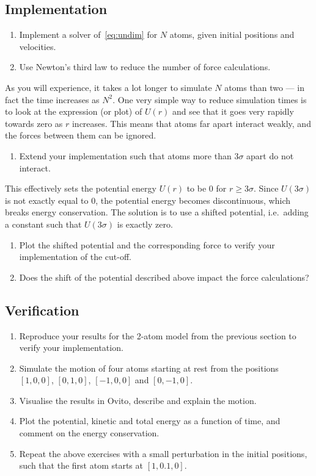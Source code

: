 \documentclass[11pt,british,a4paper]{report}
\begin{document}
\subsection{Implementation}
\begin{enumerate}[label=\roman*.]
    \item Implement a solver of~\vref{eq:undim} for \(N\) atoms, given initial positions and velocities.
    \item Use Newton's third law to reduce the number of force calculations.
\end{enumerate}

As you will experience, it takes a lot longer to simulate \(N\) atoms than two --- in fact the time increases as \(N^2\). One very simple way to reduce simulation times is to look at the expression (or plot) of \(U(r)\) and see that it goes very rapidly towards zero as \(r\) increases. This means that atoms far apart interact weakly, and the forces between them can be ignored.

\begin{enumerate}[label=\roman*., resume]
    \item Extend your implementation such that atoms more than \(3\sigma\) apart do not interact.
\end{enumerate}

This effectively sets the potential energy \(U(r)\) to be \(0\) for \(r\geq 3\sigma\). Since \(U(3\sigma)\) is not exactly equal to \(0\), the potential energy becomes discontinuous, which breaks energy conservation. The solution is to use a shifted potential, i.e.\ adding a constant such that \(U(3\sigma)\) is exactly zero.

\begin{enumerate}[label=\roman*., resume]
    \item Plot the shifted potential and the corresponding force to verify your implementation of the cut-off.
    \item Does the shift of the potential described above impact the force calculations?
\end{enumerate}

\subsection{Verification}
\begin{enumerate}[label=\roman*.]
     \item Reproduce your results for the 2-atom model from the previous section to verify your implementation.
    \item Simulate the motion of four atoms starting at rest from the positions \([1,0,0]\), \([0,1,0]\), \([-1,0,0]\) and \([0,-1,0]\).
    \item Visualise the results in Ovito, describe and explain the motion.
    \item Plot the potential, kinetic and total energy as a function of time, and comment on the energy conservation.
    \item Repeat the above exercises with a small perturbation in the initial positions, such that the first atom starts at \([1,0.1,0]\).
\end{enumerate}
\end{document}
